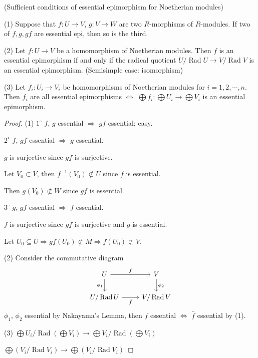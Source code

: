 \documentclass[11pt, a4paper]{report}
\begin{document}
\begin{proposition}
(Sufficient conditions of essential epimorphism for Noetherian modules)

(1) Suppose that $f: U \rightarrow V$, $g: V \rightarrow W$ are two $R$-morphisms of $R$-modules. If two of $f, g, gf$ are essential epi, then so is the third.

(2) Let $f: U \rightarrow V$ be a homomorphism of Noetherian modules. Then $f$ is an essential epimorphism if and only if the radical quotient $U/\operatorname{Rad} U \rightarrow V/\operatorname{Rad} V$ is an essential epimorphism. (Semisimple case: isomorphism)

(3) Let $f_{i}: U_{i} \rightarrow V_{i}$ be homomorphisms of Noetherian modules for $i = 1, 2, \cdots, n$. Then $f_{i}$ are all essential epimorphisms $\Leftrightarrow$ $\bigoplus f_{i}: \bigoplus U_{i} \rightarrow \bigoplus V_{i}$ is an essential epimorphism.
\end{proposition}
\begin{proof}
(1) $1^{\circ}$ $f$, $g$ essential $\Rightarrow$ $gf$ essential: easy.

$2^{\circ}$ $f$, $gf$ essential $\Rightarrow$ $g$ essential.

$g$ is surjective since $gf$ is surjective.

Let $V_{0} \subset V$, then $f^{-1}(V_{0}) \not\subset U$ since $f$ is essential.

Then $g(V_{0}) \not\subset W$ since $gf$ is essential.

$3^{\circ}$ $g$, $gf$ essential $\Rightarrow$ $f$ essential.

$f$ is surjective since $gf$ is surjective and $g$ is essential.

Let $U_{0} \subseteq U \Rightarrow gf(U_{0}) \not\subset M \Rightarrow f(U_{0}) \not\subset V$.

(2) Consider the commutative diagram
\[
\begin{tikzcd}
U \arrow[r, "f"] \arrow[d, "\phi_{1}"'] & V \arrow[d, "\phi_{2}"] \\
U/\operatorname{Rad}U \arrow[r, "\bar{f}"'] & V/\operatorname{Rad}V
\end{tikzcd}
\]
$\phi_{1}$, $\phi_{2}$ essential by Nakayama's Lemma, then $f$ essential $\Leftrightarrow$ $\bar{f}$ essential by (1).

(3) $\bigoplus U_{i}/\operatorname{Rad}\left(\bigoplus V_{i}\right) \longrightarrow \bigoplus V_{i}/\operatorname{Rad}\left(\bigoplus V_{i}\right)$

$\bigoplus (V_{i}/\operatorname{Rad}V_{i}) \rightarrow \bigoplus (V_{i}/\operatorname{Rad}V_{i})$
\end{proof}
\end{document}
